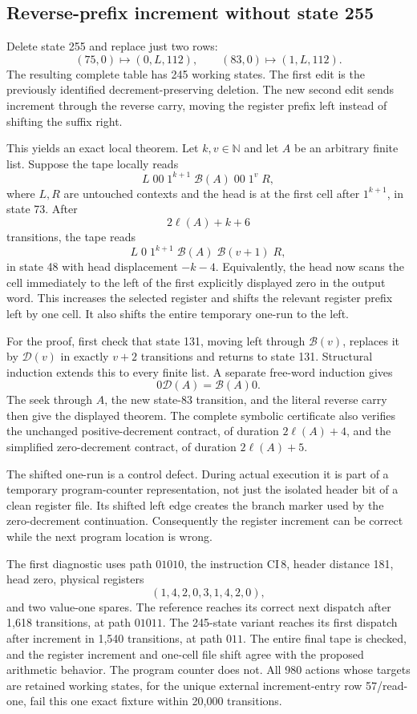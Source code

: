\subsection{Reverse-prefix increment without state 255}

Delete state 255 and replace just two rows:
\[
 (75,0)\mapsto(0,L,112),\qquad
 (83,0)\mapsto(1,L,112).
\]
The resulting complete table has 245 working states.  The first edit is the
previously identified decrement-preserving deletion.  The new second edit
sends increment through the reverse carry, moving the register prefix left
instead of shifting the suffix right.

This yields an exact local theorem.  Let $k,v\in\mathbb N$ and let $A$ be an
arbitrary finite list.  Suppose the tape locally reads
\[
 L\;00\;1^{k+1}\;\mathcal B(A)\;00\;1^v\;R,
\]
where $L,R$ are untouched contexts and the head is at the first cell after
$1^{k+1}$, in state 73.  After
\[
 2\ell(A)+k+6
\]
transitions, the tape reads
\[
 L\;0\;1^{k+1}\;\mathcal B(A)\;\mathcal B(v+1)\;R,
\]
in state 48 with head displacement $-k-4$.  Equivalently, the head now scans
the cell immediately to the left of the first explicitly displayed zero in the output word.  This increases
the selected register and shifts the relevant register prefix left by one
cell.  It also shifts the entire temporary one-run to the left.

For the proof, first check that state 131, moving left through
$\mathcal B(v)$, replaces it by $\mathcal D(v)$ in exactly $v+2$ transitions
and returns to state 131.  Structural induction extends this to every finite
list.  A separate free-word induction gives
\[
 0\mathcal D(A)=\mathcal B(A)0.
\]
The seek through $A$, the new state-83 transition, and the literal reverse
carry then give the displayed theorem.  The complete symbolic certificate
also verifies the unchanged positive-decrement contract, of duration
$2\ell(A)+4$, and the simplified zero-decrement contract, of duration
$2\ell(A)+5$.

The shifted one-run is a control defect.  During actual execution it is
part of a temporary program-counter representation, not just the isolated
header bit of a clean register file.  Its shifted left edge creates the
branch marker used by the zero-decrement continuation.  Consequently the
register increment can be correct while the next program location is wrong.

The first diagnostic uses path $01010$, the instruction $\mathrm{CI}\,8$,
header distance 181, head zero, physical registers
\[
 (1,4,2,0,3,1,4,2,0),
\]
and two value-one spares.  The reference reaches its correct next dispatch
after 1,618 transitions, at path $01011$.  The 245-state variant reaches its
first dispatch after increment in 1,540 transitions, at path $011$.  The
entire final tape is checked, and the register increment and one-cell file
shift agree with the proposed arithmetic behavior.  The program counter does
not.  All 980 actions whose targets are retained working states, for the unique
external increment-entry row 57/read-one, fail this one exact fixture within 20,000 transitions.

